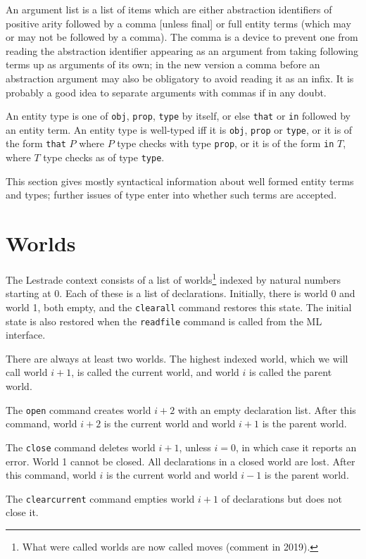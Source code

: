 An argument list is a list of items which are either abstraction identifiers of positive arity followed by a comma [unless final] or full entity terms (which may or may not be followed by a comma).   The comma is a device
to prevent one from reading the abstraction identifier appearing as an argument from taking following terms up as arguments of its own; in the new version a comma before an abstraction argument may also be obligatory to avoid reading it as an infix.   It is probably a good idea to separate arguments with commas if in any doubt.

An entity type is one of {\tt obj}, {\tt prop}, {\tt type} by itself, or else {\tt that} or {\tt in} followed by an entity term.  An entity type is well-typed iff it is {\tt obj}, {\tt prop} or {\tt type}, or it is of the form {\tt that} $P$ where $P$ type checks with type {\tt prop}, or it is of the form
{\tt in} $T$, where $T$ type checks as of type {\tt type}.

This section gives mostly syntactical information about well formed entity terms and types; further issues of type enter into whether such terms are accepted.

\section{Worlds}

The Lestrade context consists of a list of worlds\footnote{What were called worlds are now called moves (comment in 2019).} indexed by natural numbers starting at 0.   Each of these is a list of declarations.   Initially, there is world 0 and world 1,
both empty, and the {\tt clearall} command restores this state.   The initial state is also restored when the {\tt readfile} command is called from the ML interface.

There are always at least two worlds.   The highest indexed world, which we will call world $i+1$, is called the current world, and world $i$ is called the parent world.

The {\tt open} command creates world $i+2$ with an empty declaration list.   After this command, world $i+2$ is the current world and world $i+1$ is the parent world.

The {\tt close} command deletes world $i+1$, unless $i=0$, in which case it reports an error.   World 1 cannot be closed.   All declarations in a closed world are lost.
After this command, world $i$ is the current world and world $i-1$ is the parent world.  

The {\tt clearcurrent} command empties world $i+1$ of declarations but does not close it.


